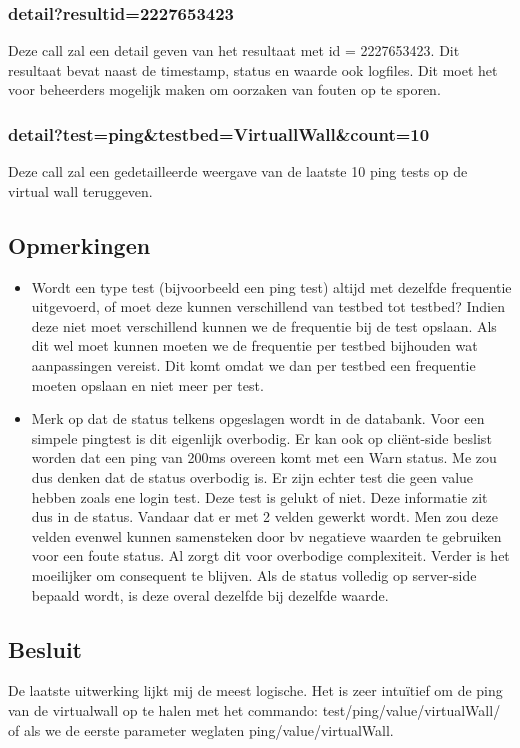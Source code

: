 \documentclass[11pt]{article}
\begin{document}
\subsubsection{detail?resultid=2227653423}
Deze call zal een detail geven van het resultaat met id = 2227653423.
Dit resultaat bevat naast de timestamp, status en waarde ook logfiles.
Dit moet het voor beheerders mogelijk maken om oorzaken van fouten op te sporen.

\subsubsection{detail?test=ping\&testbed=VirtuallWall\&count=10}
Deze call zal een gedetailleerde weergave van de laatste 10 ping tests op de virtual wall teruggeven.

\clearpage
\subsection{Opmerkingen}
\begin{itemize}
\item Wordt een type test (bijvoorbeeld een ping test) altijd met dezelfde frequentie uitgevoerd, of moet deze kunnen verschillend van testbed tot testbed? Indien deze niet moet verschillend kunnen we de frequentie bij de test opslaan. Als dit wel moet kunnen moeten we de frequentie per testbed bijhouden wat aanpassingen vereist. Dit komt omdat we dan per testbed een frequentie moeten opslaan en niet meer per test.
\item Merk op dat de status telkens opgeslagen wordt in de databank. Voor een simpele pingtest is dit eigenlijk overbodig. Er kan ook op cli\"{e}nt-side beslist worden dat een ping van 200ms overeen komt met een Warn status. Me zou dus denken dat de status overbodig is. Er zijn echter test die geen value hebben zoals ene login test. Deze test is gelukt of niet. Deze informatie zit dus in de status. Vandaar dat er met 2 velden gewerkt wordt. Men zou deze velden evenwel kunnen samensteken door bv negatieve waarden te gebruiken voor een foute status. Al zorgt dit voor overbodige complexiteit. Verder is het moeilijker om consequent te blijven. Als de status volledig op server-side bepaald wordt, is deze overal dezelfde bij dezelfde waarde.
\end{itemize}

\subsection{Besluit}
De laatste uitwerking lijkt mij de meest logische. Het is zeer intu\"{i}tief om de ping van de virtualwall op te halen met het commando: test/ping/value/virtualWall/  of als we de eerste parameter weglaten ping/value/virtualWall.
\end{document}
